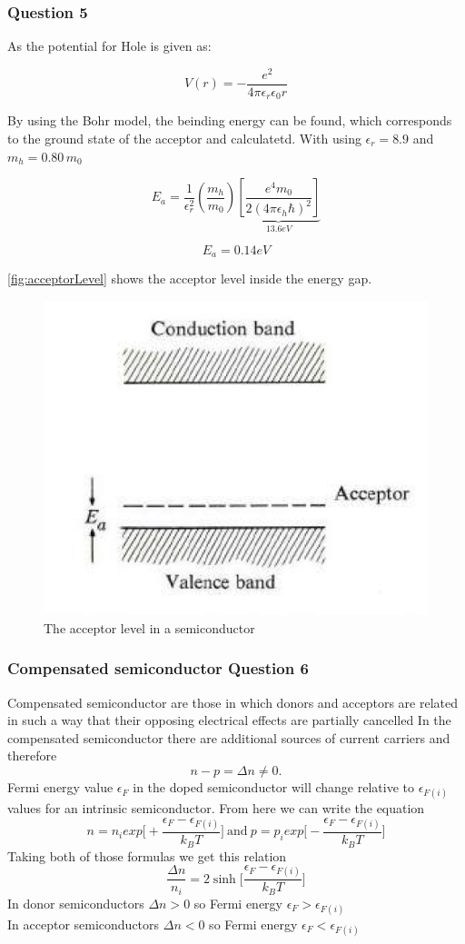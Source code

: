 \subsubsection*{Question 5}

As the potential for Hole is given as:

\begin{equation}
  V(r) = -\frac{e^2}{4\pi \epsilon_r \epsilon_0 r}
\end{equation}

By using the Bohr model, the beinding energy can be found, which
corresponds to the ground state of the acceptor and calculatetd.
With using $\epsilon_r = 8.9$ and $m_h = 0.80\,m_0$


$$
E_a = \frac{1}{\epsilon_r^2} \left(\frac{m_h}{m_0}\right) \underbrace{\left[\frac{e^4m_0}{2(4\pi\epsilon_h\hbar)^2}\right]}_{13.6eV}
$$

$$E_a =  0.14eV$$

\autoref{fig:acceptorLevel} shows the acceptor level inside the energy gap.

\begin{figure}[H]
  \centering
  \includegraphics[width=0.35\linewidth]{Graphics/Chapter3/acceptorLevel.png}
  \caption{The acceptor level in a semiconductor \cite[Elementary Solid State Physics p. 268]{elementary_SSP} }
  \label{fig:acceptorLevel}
\end{figure}

\subsubsection*{Compensated semiconductor Question 6}

Compensated semiconductor are those in which donors and acceptors are related in such a way that their opposing electrical effects are partially cancelled
In the compensated semiconductor there are additional sources of current carriers and therefore
$$
n - p = \Delta n \neq 0.
$$
Fermi energy value $\epsilon_F$ in the doped semiconductor will change relative to $\epsilon_{F(i)}$ values for an intrinsic semiconductor. From here we can write the equation
$$
n = n_i exp\bigg[+\frac{\epsilon_F - \epsilon_{F(i)}}{k_B T}\bigg] \ \mathrm{and} \
p = p_i exp\bigg[-\frac{\epsilon_F - \epsilon_{F(i)}}{k_B T}\bigg]
$$
Taking both of those formulas we get this relation
\begin{equation}
\frac{\Delta n}{n_i} = 2\sinh{\bigg[\frac{\epsilon_F - \epsilon_{F(i)}}{k_B T}\bigg]}
\end{equation}
In donor semiconductors $\Delta n > 0$ so Fermi energy $\epsilon_F > \epsilon_{F(i)}$ \\
In acceptor semiconductors $\Delta n < 0$ so Fermi energy $\epsilon_F < \epsilon_{F(i)}$

